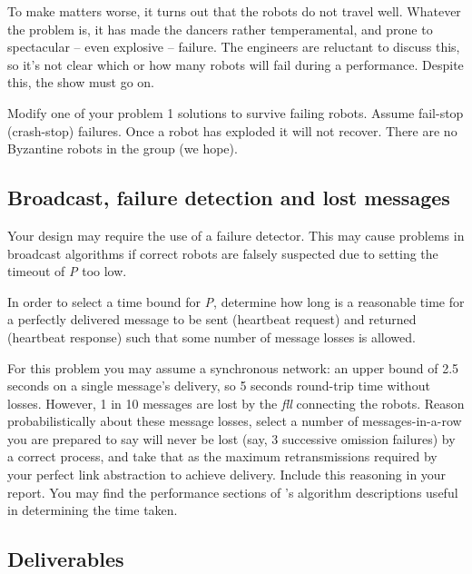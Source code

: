 \documentclass[a4paper]{article}
\begin{document}
To make matters worse, it turns out that the robots do not travel well.
Whatever the problem is, it has made the dancers rather temperamental, and
prone to spectacular -- even explosive -- failure. The engineers are reluctant
to discuss this, so it's not clear which or how many robots will fail during
a performance. Despite this, the show must go on.

Modify one of your problem 1 solutions to survive failing robots. Assume
fail-stop (crash-stop) failures. Once a robot has exploded it will not
recover. There are no Byzantine robots in the group (we hope).


\subsection*{Broadcast, failure detection and lost messages} %
\label{subsec:lost_messages}

Your design may require the use of a failure detector. This may cause problems
in broadcast algorithms if correct robots are falsely suspected due to setting
the timeout of \emph{P} too low.

In order to select a time bound for \emph{P}, determine how long is a
reasonable time for a perfectly delivered message to be sent (heartbeat
request) and returned (heartbeat response) such that some number of message
losses is allowed.

For this problem you may assume a synchronous network: an upper bound of 2.5
seconds on a single message's delivery, so 5 seconds round-trip time without
losses. However, 1 in 10 messages are lost by the \emph{fll} connecting the
robots. Reason probabilistically about these message losses, select a number
of messages-in-a-row you are prepared to say will never be lost (say, 3
successive omission failures) by a correct process, and take that as the
maximum retransmissions required by your perfect link abstraction to achieve
delivery. Include this reasoning in your report. You may find the performance
sections of \cite{cachin2011}'s algorithm descriptions useful in determining
the time taken.




\subsection*{Deliverables} %
\label{sub:p2_deliverable}
\end{document}
